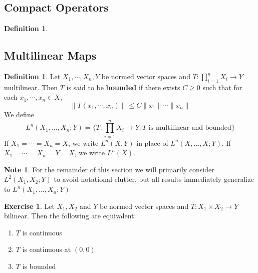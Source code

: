 \documentclass[12pt]{amsart}
\theoremstyle{definition}
\newtheorem{defn}[definition]{Definition}
\newtheorem{note}[definition]{Note}
\newtheorem{ex}[definition]{Exercise}
\newcommand{\lex}[1]{\label{ex:#1}}
\newcommand{\ld}[1]{\label{defn:#1}}
\begin{document}
	
	
	







	
	
	
	






\newpage
\subsection{Compact Operators}


\begin{defn}

\end{defn}























	\newpage
	\subsection{Multilinear Maps}	
	\begin{defn} \ld{43001}
	Let $X_1, \cdots, X_n, Y$ be normed vector spaces and $T: \prod\limits_{i=1}^n X_i \rightarrow Y$ multilinear. Then $T$ is said to be \textbf{bounded} if there exists $C \geq 0$ such that for each $x_1, \cdots, x_n \in X$, $$\|T(x_1, \cdots, x_n)\| \leq C \|x_1\| \cdots \|x_n\|$$
	We define $$L^n (X_1, \dots, X_n; Y) = \bigg\{T: \prod\limits_{i=1}^n X_i \rightarrow Y: T \text{ is multilinear and bounded}\bigg \}$$ 
	If $X_1 = \cdots = X_n = X$, we write $L^n(X,Y)$ in place of $L^n (X, \dots, X; Y) $. If $X_1 = \cdots = X_n = Y =  X$, we write $L^n(X)$. 
	\end{defn}
	
	\begin{note}
	For the remainder of this section we will primarily consider $L^2(X_1, X_2; Y)$ to avoid notational clutter, but all results immediately generalize to $L^n(X_1, \ldots, X_n;Y)$
	\end{note}
	
	\begin{ex} \lex{43002}
	Let $X_1, X_2$ and $Y$ be normed vector spaces and $T: X_1 \times X_2 \rightarrow Y$ bilinear. Then the following are equivalent:
	\begin{enumerate}
			\item $T$ is continuous
			\item $T$ is continuous at $(0,0)$
			\item $T$ is bounded
		\end{enumerate}
	\end{ex}
	
\end{document}
